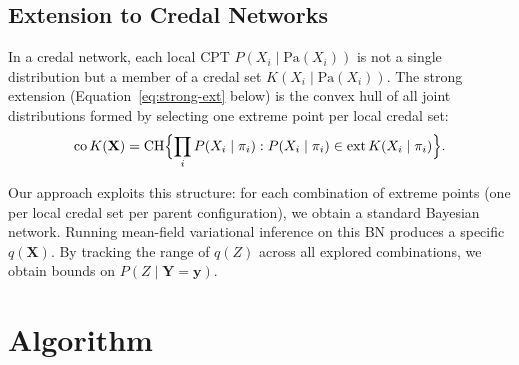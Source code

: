 \documentclass[11pt]{article}
\begin{document}
\subsection{Extension to Credal Networks}

In a credal network, each local CPT $P(X_i \mid \mathrm{Pa}(X_i))$ is not a single
distribution but a member of a credal set $K(X_i \mid \mathrm{Pa}(X_i))$.
The strong extension (Equation~\eqref{eq:strong-ext} below) is the convex hull of
all joint distributions formed by selecting one extreme point per local credal set:
\begin{equation}\label{eq:strong-ext}
  \mathrm{co}\,K(\mathbf{X}) = \mathrm{CH}\Bigl\{
    \prod_{i} P(X_i \mid \pi_i) : P(X_i \mid \pi_i) \in \mathrm{ext}\,K(X_i \mid \pi_i)
  \Bigr\}.
\end{equation}

Our approach exploits this structure: for each combination of extreme points (one per
local credal set per parent configuration), we obtain a standard Bayesian network.
Running mean-field variational inference on this BN produces a specific $q(\mathbf{X})$.
By tracking the range of $q(Z)$ across all explored combinations, we obtain bounds
on $P(Z \mid \mathbf{Y} = \mathbf{y})$.

\section{Algorithm}
\end{document}
